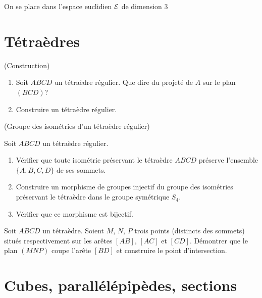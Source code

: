 \documentclass[a4paper,11pt,reqno]{amsart}
\begin{document}

\begin{convention}
  On se place dans l'espace euclidien $\mathcal{E}$ de dimension $3$
\end{convention}


\section{Tétraèdres}

\begin{exo}[0.7] (Construction)
  \begin{enumerate}
    \item Soit $ABCD$ un tétraèdre régulier. Que dire du projeté de $A$ sur le plan $(BCD)$?
    \item Construire un tétraèdre régulier.
  \end{enumerate}
\end{exo}

\begin{exo} (Groupe des isométries d'un tétraèdre régulier)

 Soit $ABCD$ un tétraèdre régulier.
  \begin{enumerate}
    \item Vérifier que toute isométrie préservant le tétraèdre $ABCD$ préserve l'ensemble $\{A,B,C,D\}$ de ses sommets.
    \item Construire un morphisme de groupes injectif du groupe des isométries préservant le tétraèdre dans le groupe symétrique $S_4$.
    \item Vérifier que ce morphisme est bijectif.
  \end{enumerate}
\end{exo}


\begin{exo}[.7]

  Soit $ABCD$ un tétraèdre. Soient $M$, $N$, $P$ trois points (distincts des sommets) situés respectivement sur les arêtes $[AB]$, $[AC]$ et $[CD]$. Démontrer que le plan $(MNP)$ coupe l'arête $[BD]$ et construire le point d'intersection.
\end{exo}


\section{Cubes, parallélépipèdes, sections}
\end{document}
